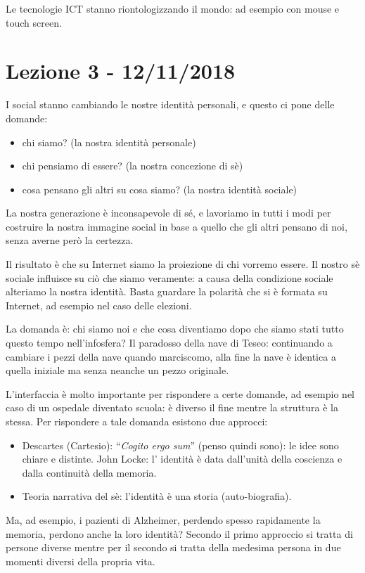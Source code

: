 \documentclass[a4page, 11pt]{article}
\begin{document}
Le tecnologie ICT stanno riontologizzando il mondo: ad esempio con mouse e touch screen.


\section*{Lezione 3 - 12/11/2018}
I social stanno cambiando le nostre identità personali, e questo ci pone delle domande:
\begin{itemize}
  \item chi siamo? (la nostra identità personale)
  \item chi pensiamo di essere? (la nostra concezione di sè)
  \item cosa pensano gli altri su cosa siamo? (la nostra identità sociale)
\end{itemize}

La nostra generazione è inconsapevole di sé, e lavoriamo in tutti i modi per costruire la nostra immagine social in base a quello che gli altri pensano di noi, senza averne però la certezza.

Il risultato è che su Internet siamo la proiezione di chi vorremo essere.
Il nostro sè sociale influisce su ciò che siamo veramente: a causa della condizione sociale alteriamo la nostra identità.
Basta guardare la polarità che si è formata su Internet, ad esempio nel caso delle elezioni.

La domanda è: chi siamo noi e che cosa diventiamo dopo che siamo stati tutto questo tempo nell'infosfera?
Il paradosso della nave di Teseo: continuando a cambiare i pezzi della nave quando marciscomo, alla fine la nave è identica a quella iniziale ma senza neanche un pezzo originale.

L'interfaccia è molto importante per rispondere a certe domande, ad esempio nel caso di un ospedale diventato scuola: è diverso il fine  mentre la struttura è la stessa.
Per rispondere a tale domanda esistono due approcci:
\begin{itemize}
  \item Descartes (Cartesio): ``\textit{Cogito ergo sum}'' (penso quindi sono): le idee sono chiare e distinte. John Locke: l' identità è data dall'unità della coscienza e dalla continuità della memoria.
  \item Teoria narrativa del sè: l'identità è una storia (auto-biografia).
\end{itemize}

Ma, ad esempio, i pazienti di Alzheimer, perdendo spesso rapidamente la memoria, perdono anche la loro identità?
Secondo il primo approccio si tratta di persone diverse mentre per il secondo si tratta della medesima persona in due momenti diversi della propria vita.
\end{document}
